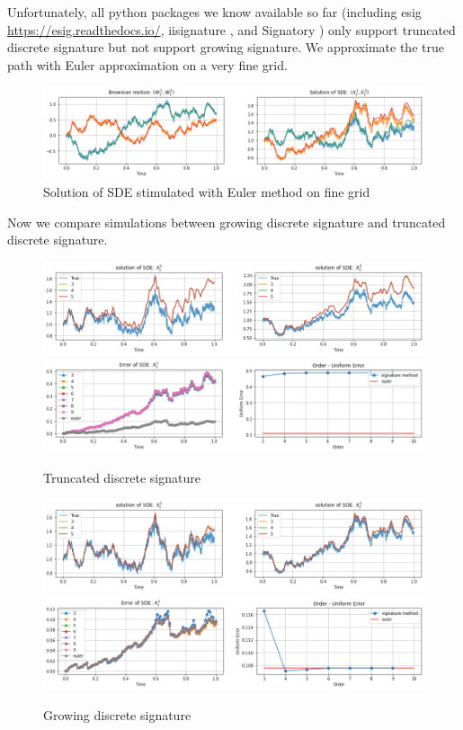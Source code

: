 \documentclass[12pt]{report}
\theoremstyle{definition}
\theoremstyle{remark}
\begin{document}
Unfortunately, all python packages we know available so far (including esig \url{https://esig.readthedocs.io/}, iisignature \cite{reizenstein2018iisignature}, and Signatory \cite{kidger2020signatory}) only support truncated discrete signature but not support growing signature. We approximate the true path with Euler approximation on a very fine grid.
\begin{figure}[H]
    \centering
    \includegraphics[width=\textwidth]{figs/sde1.png}
    \caption{Solution of SDE stimulated with Euler method on fine grid}
\end{figure}
Now we compare simulations between growing discrete signature and truncated discrete signature.
\begin{figure}[H]
    \centering
    \includegraphics[width=\textwidth]{figs/sde2.png}
    \includegraphics[width=\textwidth]{figs/sde3.png}
    \caption{Truncated discrete signature}
\end{figure}
\begin{figure}[H]
    \centering
    \includegraphics[width=\textwidth]{figs/sde4.png}
    \includegraphics[width=\textwidth]{figs/sde5.png}
    \caption{Growing discrete signature}
\end{figure}
\end{document}
